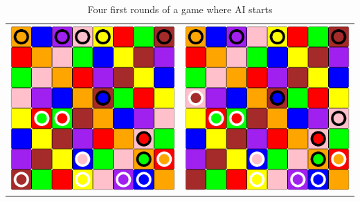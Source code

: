 \documentclass[a4paper, 11pt]{beamer}
\begin{document}
\begin{frame}
\begin{table}[htbp]
\begin{tabular}{c c}
    \includegraphics[scale = 0.11]{mathieu_4.png} & \includegraphics[scale = 0.11]{mathieu_5.png} \\
  \end{tabular}
  \caption{Four first rounds of a game where AI starts}
 \end{table}
\end{frame}
\end{document}
